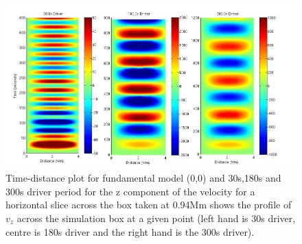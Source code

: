 \documentclass[authoryear,final,1p]{elsarticle}
\begin{document}

\begin{figure}[h]\label{fig7_dt_30_180_300_0_horiz_p94Mm}
\includegraphics[scale=0.4]{images/fig5_dt_30_180_300_0_horiz_p94Mm.jpg}
\caption{Time-distance plot for fundamental model (0,0)  and 30s,180s and 300s driver period for the z component of the velocity for a horizontal slice across the box  taken at 0.94Mm shows  the profile of $ v_{z}$ across the simulation box at a given point (left hand is 30s driver, centre is 180s driver and the right hand is the 300s driver). }
\end{figure}

\end{document}
